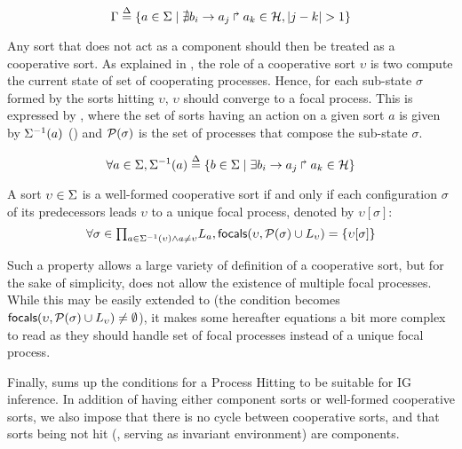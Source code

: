 \begin{equation}
\Gamma \stackrel{\Delta}= \{a \in \Sigma \mid \nexists b_i\rightarrow a_j\Rsh a_k \in \mathcal{H}, |j - k| > 1\} \\
\label{eq:PH-components}
\end{equation}

Any sort that does not act as a component should then be treated as a cooperative sort.
As explained in , the role of a cooperative sort $\upsilon$ is two compute the current
state of set of cooperating processes.
Hence, for each sub-state $\sigma$ formed by the sorts hitting $\upsilon$, $\upsilon$ should
converge to a focal process.
This is expressed by , where
the set of sorts having an action on a given sort $a$ is given by 
$\Sigma^{-1}(a)$ ()
and $\mathcal{P}(\sigma)$ is the set of processes that compose the sub-state $\sigma$.

\begin{equation}
\forall a \in \Sigma, \Sigma^{-1}(a) \stackrel{\Delta}= \{b \in \Sigma \mid \exists b_i\rightarrow a_j\Rsh a_k\in\mathcal{H} \}
\label{eq:ph_direct_predec}
\end{equation}

\begin{property}\label{pro:wf-cooperative-sort}
A sort $\upsilon\in\Sigma$ is a well-formed cooperative sort if and only if
each configuration $\sigma$ of its predecessors leads $\upsilon$ to a unique focal process,
denoted by $\upsilon[\sigma]$:
\[
\forall \sigma \in {\textstyle\prod_{
a\in\Sigma^{-1}(\upsilon) \wedge a\neq \upsilon}}
L_{a},
\mathsf{focals}(\upsilon,\mathcal{P}(\sigma)\cup L_\upsilon) = \{ \upsilon[\sigma] \}\]
\end{property}

Such a property allows a large variety of definition of a cooperative sort, but
for the sake of simplicity, does not allow the existence of multiple focal processes.
While this may be easily extended to (the condition becomes 
$\mathsf{focals}(\upsilon,\mathcal{P}(\sigma)\cup L_\upsilon)\neq\emptyset$), it makes some hereafter
equations a bit more complex to read as they should handle set of focal processes instead of a
unique focal process.


Finally,  sums up the conditions for a Process Hitting to be suitable for IG
inference.
In addition of having either component sorts or well-formed cooperative sorts, we also impose that
there is no cycle between cooperative sorts, and that
sorts being not hit (\ie{}, serving as invariant environment) are components.

